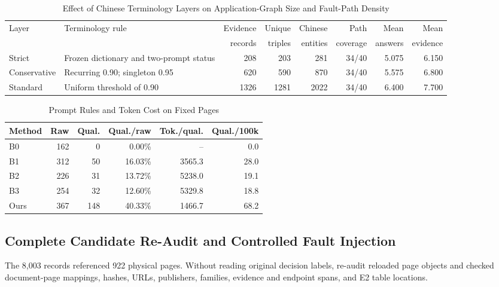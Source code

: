 \documentclass[conference,a4paper]{IEEEtran}
\begin{document}
\begin{table}[!t]
\caption{Effect of Chinese Terminology Layers on Application-Graph Size and Fault-Path Density}
\label{tab:tiers}
\centering
\footnotesize
\setlength{\tabcolsep}{3.5pt}
\begin{tabularx}{\textwidth}{l>{\raggedright\arraybackslash}Xrrrrrr}
\toprule
Layer & Terminology rule & Evidence & Unique & Chinese & Path & Mean & Mean \\
      &                  & records  & triples & entities & coverage & answers & evidence \\
\midrule
Strict & Frozen dictionary and two-prompt status & 208  & 203  & 281  & 34/40 & 5.075 & 6.150 \\
Conservative & Recurring 0.90; singleton 0.95 & 620  & 590  & 870  & 34/40 & 5.575 & 6.800 \\
Standard & Uniform threshold of 0.90 & 1326 & 1281 & 2022 & 34/40 & 6.400 & 7.700 \\
\bottomrule
\end{tabularx}
\end{table}

\begin{table}[!t]
\caption{Prompt Rules and Token Cost on Fixed Pages}
\label{tab:prompt}
\centering
\footnotesize
\setlength{\tabcolsep}{2.7pt}
\begin{tabular}{lrrrrr}
\toprule
Method & Raw & Qual. & Qual./raw & Tok./qual. & Qual./100k \\
\midrule
B0   & 162 & 0   & 0.00\%  & --     & 0.0 \\
B1   & 312 & 50  & 16.03\% & 3565.3 & 28.0 \\
B2   & 226 & 31  & 13.72\% & 5238.0 & 19.1 \\
B3   & 254 & 32  & 12.60\% & 5329.8 & 18.8 \\
Ours & 367 & 148 & 40.33\% & 1466.7 & 68.2 \\
\bottomrule
\end{tabular}
\end{table}

\subsection{Complete Candidate Re-Audit and Controlled Fault Injection}

The 8,003 records referenced 922 physical pages. Without reading original decision labels, re-audit reloaded page objects and checked document-page mappings, hashes, URLs, publishers, families, evidence and endpoint spans, and E2 table locations.
\end{document}
